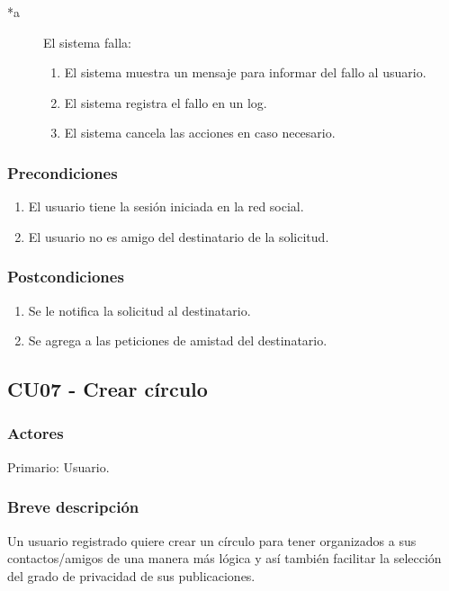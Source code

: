 \documentclass[12pt, a4paper, titlepage]{article}
\begin{document}
\begin{description}
	\item [*a] El sistema falla:
	\begin{enumerate}
		\item El sistema muestra un mensaje para informar del fallo al usuario.
		\item El sistema registra el fallo en un log.
		\item El sistema cancela las acciones en caso necesario.
	\end{enumerate}
\end{description}

\subsubsection{Precondiciones}
\begin{enumerate}
	\item El usuario tiene la sesión iniciada en la red social.
	\item El usuario no es amigo del destinatario de la solicitud.
\end{enumerate}
\subsubsection{Postcondiciones}
\begin{enumerate}
	\item Se le notifica la solicitud al destinatario.
	\item Se agrega a las peticiones de amistad del destinatario.
\end{enumerate}



\subsection{CU07 - Crear círculo}
\subsubsection{Actores}
Primario: Usuario.
\subsubsection{Breve descripción}
Un usuario registrado quiere crear un círculo para tener organizados a sus contactos/amigos de una manera más lógica y así también facilitar la selección del grado de privacidad de sus publicaciones.
\end{document}
